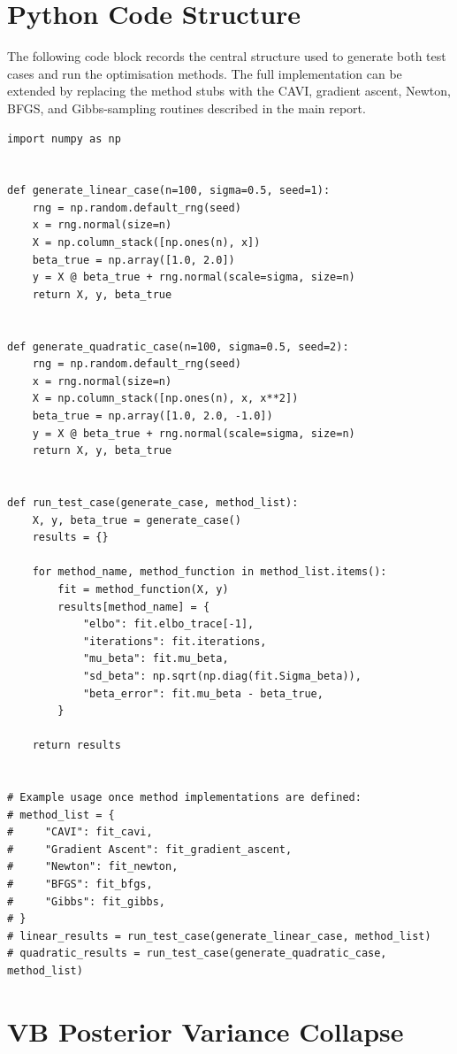 \documentclass[11pt,a4paper]{article}
\begin{document}
\section{Python Code Structure}
\label{app:python-code}

The following code block records the central structure used to generate both test cases and run the optimisation methods. The full implementation can be extended by replacing the method stubs with the CAVI, gradient ascent, Newton, BFGS, and Gibbs-sampling routines described in the main report.

\begin{verbatim}
import numpy as np


def generate_linear_case(n=100, sigma=0.5, seed=1):
    rng = np.random.default_rng(seed)
    x = rng.normal(size=n)
    X = np.column_stack([np.ones(n), x])
    beta_true = np.array([1.0, 2.0])
    y = X @ beta_true + rng.normal(scale=sigma, size=n)
    return X, y, beta_true


def generate_quadratic_case(n=100, sigma=0.5, seed=2):
    rng = np.random.default_rng(seed)
    x = rng.normal(size=n)
    X = np.column_stack([np.ones(n), x, x**2])
    beta_true = np.array([1.0, 2.0, -1.0])
    y = X @ beta_true + rng.normal(scale=sigma, size=n)
    return X, y, beta_true


def run_test_case(generate_case, method_list):
    X, y, beta_true = generate_case()
    results = {}

    for method_name, method_function in method_list.items():
        fit = method_function(X, y)
        results[method_name] = {
            "elbo": fit.elbo_trace[-1],
            "iterations": fit.iterations,
            "mu_beta": fit.mu_beta,
            "sd_beta": np.sqrt(np.diag(fit.Sigma_beta)),
            "beta_error": fit.mu_beta - beta_true,
        }

    return results


# Example usage once method implementations are defined:
# method_list = {
#     "CAVI": fit_cavi,
#     "Gradient Ascent": fit_gradient_ascent,
#     "Newton": fit_newton,
#     "BFGS": fit_bfgs,
#     "Gibbs": fit_gibbs,
# }
# linear_results = run_test_case(generate_linear_case, method_list)
# quadratic_results = run_test_case(generate_quadratic_case, method_list)
\end{verbatim}

\section{VB Posterior Variance Collapse}
\label{app:vb-collapse}
\end{document}
